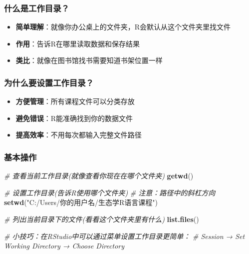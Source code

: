 \documentclass[
]{book}
\newenvironment{Shaded}{\begin{snugshade}}{\end{snugshade}}
\newcommand{\CommentTok}[1]{\textcolor[rgb]{0.56,0.35,0.01}{\textit{#1}}}
\newcommand{\FunctionTok}[1]{\textcolor[rgb]{0.13,0.29,0.53}{\textbf{#1}}}
\newcommand{\NormalTok}[1]{#1}
\newcommand{\StringTok}[1]{\textcolor[rgb]{0.31,0.60,0.02}{#1}}
\providecommand{\tightlist}{%
  \setlength{\itemsep}{0pt}\setlength{\parskip}{0pt}}
\begin{document}
\hypertarget{ux4ec0ux4e48ux662fux5de5ux4f5cux76eeux5f55}{%
\subsubsection{什么是工作目录？}\label{ux4ec0ux4e48ux662fux5de5ux4f5cux76eeux5f55}}

\begin{itemize}
\tightlist
\item
  \textbf{简单理解}：就像你办公桌上的文件夹，R会默认从这个文件夹里找文件
\item
  \textbf{作用}：告诉R在哪里读取数据和保存结果
\item
  \textbf{类比}：就像在图书馆找书需要知道书架位置一样
\end{itemize}

\hypertarget{ux4e3aux4ec0ux4e48ux8981ux8bbeux7f6eux5de5ux4f5cux76eeux5f55}{%
\subsubsection{为什么要设置工作目录？}\label{ux4e3aux4ec0ux4e48ux8981ux8bbeux7f6eux5de5ux4f5cux76eeux5f55}}

\begin{itemize}
\tightlist
\item
  \textbf{方便管理}：所有课程文件可以分类存放
\item
  \textbf{避免错误}：R能准确找到你的数据文件
\item
  \textbf{提高效率}：不用每次都输入完整文件路径
\end{itemize}

\hypertarget{ux57faux672cux64cdux4f5c}{%
\subsubsection{基本操作}\label{ux57faux672cux64cdux4f5c}}

\begin{Shaded}
\begin{Highlighting}[]
\CommentTok{\# 查看当前工作目录(就像查看你现在在哪个文件夹)}
\FunctionTok{getwd}\NormalTok{()}

\CommentTok{\# 设置工作目录(告诉R使用哪个文件夹)}
\CommentTok{\# 注意：路径中的斜杠方向}
\FunctionTok{setwd}\NormalTok{(}\StringTok{"C:/Users/你的用户名/生态学R语言课程"}\NormalTok{) }

\CommentTok{\# 列出当前目录下的文件(看看这个文件夹里有什么)}
\FunctionTok{list.files}\NormalTok{()}

\CommentTok{\# 小技巧：在RStudio中可以通过菜单设置工作目录更简单：}
\CommentTok{\# Session → Set Working Directory → Choose Directory}
\end{Highlighting}
\end{Shaded}
\end{document}
